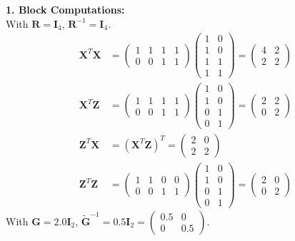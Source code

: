 \documentclass[11pt,twoside,openright]{book}
\begin{document}
\textbf{1. Block Computations:}\\
With $\mathbf{R} = \mathbf{I}_4$, $\mathbf{R}^{-1} = \mathbf{I}_4$.
\begin{align*}
\mathbf{X}^T \mathbf{X} &= \begin{pmatrix} 1 & 1 & 1 & 1 \\ 0 & 0 & 1 & 1 \end{pmatrix} \begin{pmatrix} 1 & 0 \\ 1 & 0 \\ 1 & 1 \\ 1 & 1 \end{pmatrix} = \begin{pmatrix} 4 & 2 \\ 2 & 2 \end{pmatrix} \\
\mathbf{X}^T \mathbf{Z} &= \begin{pmatrix} 1 & 1 & 1 & 1 \\ 0 & 0 & 1 & 1 \end{pmatrix} \begin{pmatrix} 1 & 0 \\ 1 & 0 \\ 0 & 1 \\ 0 & 1 \end{pmatrix} = \begin{pmatrix} 2 & 2 \\ 0 & 2 \end{pmatrix} \\
\mathbf{Z}^T \mathbf{X} &= (\mathbf{X}^T \mathbf{Z})^T = \begin{pmatrix} 2 & 0 \\ 2 & 2 \end{pmatrix} \\
\mathbf{Z}^T \mathbf{Z} &= \begin{pmatrix} 1 & 1 & 0 & 0 \\ 0 & 0 & 1 & 1 \end{pmatrix} \begin{pmatrix} 1 & 0 \\ 1 & 0 \\ 0 & 1 \\ 0 & 1 \end{pmatrix} = \begin{pmatrix} 2 & 0 \\ 0 & 2 \end{pmatrix}
\end{align*}
With $\mathbf{G} = 2.0 \mathbf{I}_2$, $\widetilde{\mathbf{G}}^{-1} = 0.5 \mathbf{I}_2 = \begin{pmatrix} 0.5 & 0 \\ 0 & 0.5 \end{pmatrix}$.
\end{document}
